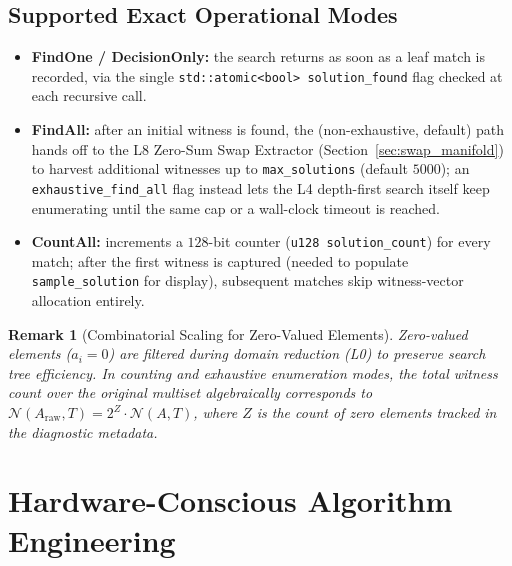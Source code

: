 \documentclass[journal,onecolumn,11pt]{IEEEtran}
\newtheorem{remark}{Remark}
\begin{document}
\subsection{Supported Exact Operational Modes}
\begin{itemize}
    \item \textbf{FindOne / DecisionOnly:} the search returns as soon as a leaf match is recorded, via the single \texttt{std::atomic<bool> solution\_found} flag checked at each recursive call.
    \item \textbf{FindAll:} after an initial witness is found, the (non-exhaustive, default) path hands off to the L8 Zero-Sum Swap Extractor (Section~\ref{sec:swap_manifold}) to harvest additional witnesses up to \texttt{max\_solutions} (default $5000$); an \texttt{exhaustive\_find\_all} flag instead lets the L4 depth-first search itself keep enumerating until the same cap or a wall-clock timeout is reached.
    \item \textbf{CountAll:} increments a $128$-bit counter (\texttt{u128 solution\_count}) for every match; after the first witness is captured (needed to populate \texttt{sample\_solution} for display), subsequent matches skip witness-vector allocation entirely.
\end{itemize}

\begin{remark}[Combinatorial Scaling for Zero-Valued Elements]
\label{rem:zero-count}
Zero-valued elements ($a_i = 0$) are filtered during domain reduction (L0) to preserve search tree efficiency. In counting and exhaustive enumeration modes, the total witness count over the original multiset algebraically corresponds to $\mathcal{N}(A_{\text{raw}}, T) = 2^Z \cdot \mathcal{N}(A, T)$, where $Z$ is the count of zero elements tracked in the diagnostic metadata.
\end{remark}

\section{Hardware-Conscious Algorithm Engineering}
\label{sec:hardware_engineering}
\end{document}
